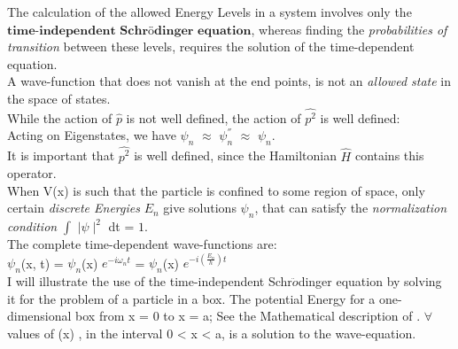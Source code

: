 \documentclass[a4paper, 10pt, onepage]{elegantbook}
\begin{document}
{The calculation of the allowed Energy Levels in a system involves only the $\mathbf{\textbf{time-independent Schrödinger equation}}$, whereas finding the \emph{probabilities of transition} between these levels, requires the solution of the time-dependent equation.  \\

A wave-function that does not vanish at the end points, is not an \emph{allowed state} in the space of states.  \\

While the action of $\hat{p}$ is not well defined, the action of $\hat{p^2}$ is well defined:  \\

Acting on Eigenstates, we have $\psi_n$ $\approx$ $\psi_n^{''}$ $\approx$ $\psi_n$.  \\

It is important that $\hat{p^2}$ is well defined, since the Hamiltonian $\hat{H}$ contains this operator.  \\

When V(x) is such that the particle is confined to some region of space, only certain \emph{discrete Energies} $E_n$ give solutions $\psi_n$, that can satisfy the \emph{normalization condition} $\int$ $\mid \psi \mid^2$ dt = $1$.  \\

The complete time-dependent wave-functions are:  \\

$\psi_n$(x, t) = $\psi_n$(x) $e^{-i \omega_n t}$ = $\psi_n$(x) $e^{-i(\frac{E_n}{h})t}$  \\

I will illustrate the use of the time-independent Schr$\ddot{o}$dinger equation by solving it for the problem of a particle in a box. The potential Energy for a one-dimensional box from x = 0 to x = a; See the Mathematical description of \pageref{Harmonic Oscillator}. $\forall$ values of (x) , in the interval 0 < x < a, is a solution to the wave-equation. \\

\begin{figure}[h!]
\centering
{}
\end{figure}}
\end{document}
